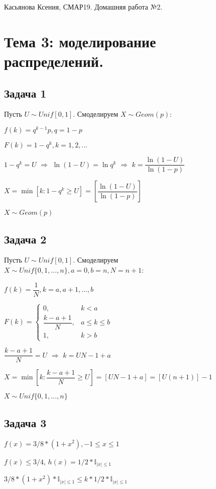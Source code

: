\documentclass[a4paper,12pt]{article} %
\begin{document}
{ Касьянова Ксения, СМАР19. Домашняя работа №2. }

\noindent\makebox[\linewidth]{\rule{\textwidth}{0.4pt}}


\section*{Тема 3: моделирование распределений.}
\subsection*{Задача 1}

Пусть $U\sim Unif[0,1]$. Смоделируем $X\sim Geom(p)$: 

$f(k) = q^{k-1}p, q=1-p$

$F(k)=1-q^k, k=1,2,...$

$1-q^k=U$ $\Rightarrow$ $\ln(1-U) = \ln q^k$
$\Rightarrow$
$k=\dfrac{\ln(1-U)}{\ln(1-p)}$

$X=\min[k:1-q^k\geq U ] =  \left[ \dfrac{\ln(1-U)}{\ln(1-p)} \right]$

$X\sim Geom(p)$

\subsection*{Задача 2}

Пусть $U\sim Unif[0,1]$. Смоделируем $X\sim Unif\{0,1,...,n\}, a=0, b=n, N = n+1 $: 

$f(k) = \dfrac{1}{N}, k=a,a+1,...,b $

$F(k)= \begin{cases}
0, & k < a\\
\dfrac{k-a+1}{N}, & a\leq k \leq  b\\
1, & k > b
\end{cases}
$

$\dfrac{k-a+1}{N}=U$ $\Rightarrow$ $k = UN-1+a $

$X=\min\left[k: \dfrac{k-a+1}{N} \geq U \right] = [UN-1+a] = [U(n+1)]-1  $

$X\sim Unif\{0,1,...,n\}$



\subsection*{Задача 3}

$f(x) = 3/8 * (1+x^2), - 1 \leq x \leq 1$ 

$f(x) \leq 3/4$, $h(x) = 1/2*\mathbb{I}_{ |x| \leq 1}$

$3/8 * (1+x^2) * \mathbb{I}_{ |x| \leq 1} \leq k*1/2*\mathbb{I}_{ |x| \leq 1}$
\end{document}
